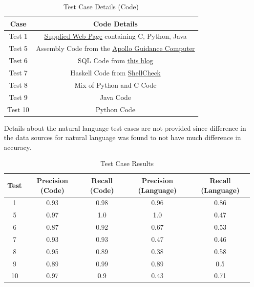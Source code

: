 \documentclass[12pt]{scrreprt}
\begin{document}

\begin{table}[h]
    \centering
    \begin{tabular}{|c|c|}
        \hline
        \textbf{Case} & Code Details \\
        \hline
        Test 1 & \href{https://eli.thegreenplace.net/2018/type-erasure-and-reification/}{Supplied Web Page} containing C, Python, Java \\
        \hline
        Test 5 & Assembly Code from the \href{https://github.com/chrislgarry/Apollo-11/blob/master/Luminary099/AOSTASK_AND_AOSJOB.agc}{Apollo Guidance Computer} \\
        \hline
        Test 6 & SQL Code from \href{https://dev.to/tyzia/example-of-complex-sql-query-to-get-as-much-data-as-possible-from-database-9he}{this blog} \\
        \hline
        Test 7 & Haskell Code from \href{https://github.com/koalaman/shellcheck}{ShellCheck}\\
        \hline
        Test 8 & Mix of Python and C Code\\
        \hline
        Test 9 & Java Code\\
        \hline
        Test 10 & Python Code\\
        \hline
    \end{tabular}
    \caption{Test Case Details (Code)}
    \label{tab:results}
\end{table}


Details about the natural language test cases are not provided since difference in the data sources for natural language was found to not have much difference in accuracy.

\begin{table}[h]
    \centering
    \begin{tabular}{|c|c|c|c|c|}
        \hline
        \textbf{Test} & \textbf{Precision (Code)} & \textbf{Recall (Code)} & \textbf{Precision (Language)} & \textbf{Recall (Language)} \\
        \hline
        1 & 0.93 & 0.98 & 0.96 & 0.86 \\
        \hline
        5 & 0.97 & 1.0 & 1.0 & 0.47 \\
        \hline
        6 & 0.87 & 0.92 & 0.67 & 0.53 \\
        \hline
        7 & 0.93 & 0.93 & 0.47 & 0.46 \\
        \hline
        8 & 0.95 & 0.89 & 0.38 & 0.58 \\
        \hline
        9 & 0.89 & 0.99 & 0.89 & 0.5 \\
        \hline
        10 & 0.97 & 0.9 & 0.43 & 0.71 \\
        \hline
    \end{tabular}
    \caption{Test Case Results}
    \label{tab:results}
\end{table}
\end{document}
